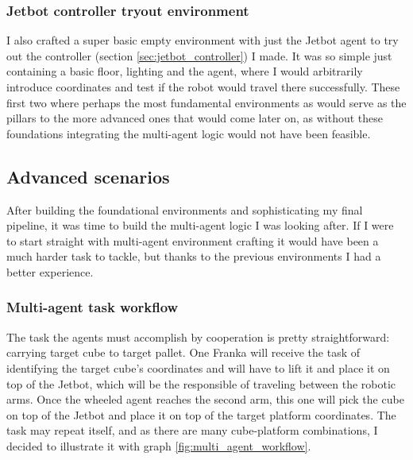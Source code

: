\subsubsection{Jetbot controller tryout environment}
I also crafted a super basic empty environment with just the Jetbot agent to try out the controller (section \ref{sec:jetbot_controller}) I made. It was so simple just containing a basic floor, lighting and the agent, where I would arbitrarily introduce coordinates and test if the robot would travel there successfully. These first two where perhaps the most fundamental environments as would serve as the pillars to the more advanced ones that would come later on, as without these foundations integrating the multi-agent logic would not have been feasible. 

\subsection{Advanced scenarios}
After building the foundational environments and sophisticating my final pipeline, it was time to build the multi-agent logic I was looking after. If I were to start straight with multi-agent environment crafting it would have been a much harder task to tackle, but thanks to the previous environments I had a better experience.

\subsubsection{Multi-agent task workflow}
The task the agents must accomplish by cooperation is pretty straightforward: carrying target cube to target pallet. One Franka will receive the task of identifying the target cube's coordinates and will have to lift it and place it on top of the Jetbot, which will be the responsible of traveling between the robotic arms. Once the wheeled agent reaches the second arm, this one will pick the cube on top of the Jetbot and place it on top of the target platform coordinates. The task may repeat itself, and as there are many cube-platform combinations, I decided to illustrate it with graph \ref{fig:multi_agent_workflow}.

